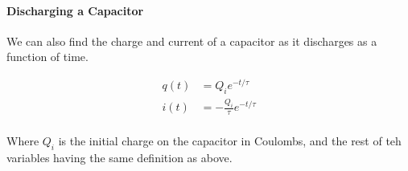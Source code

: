 \paragraph*{Discharging a Capacitor}
We can also find the charge and current of a capacitor as it discharges as a function of time.

\begin{align*}
    q(t) &= Q_ie^{-t/\tau}\\
    i(t) &= -\frac{Q_i}{\tau}e^{-t/\tau}\\
\end{align*}

Where $Q_i$ is the initial charge on the capacitor in Coulombs, and the rest of teh variables having the same definition as above.